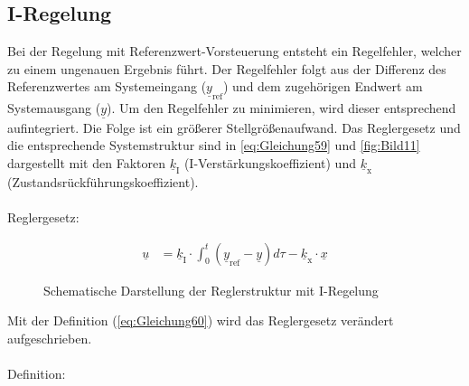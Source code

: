 \subsection{I-Regelung} \label{sec:iregler}
Bei der Regelung mit Referenzwert-Vorsteuerung entsteht ein Regelfehler, welcher zu einem ungenauen Ergebnis führt. Der Regelfehler folgt aus der Differenz des Referenzwertes am Systemeingang ($\underline{y}_{\mathrm{ref}}$) und dem zugehörigen Endwert am Systemausgang ($\underline{y}$). Um den Regelfehler zu minimieren, wird dieser entsprechend aufintegriert. Die Folge ist ein größerer Stellgrößenaufwand. Das Reglergesetz und die entsprechende Systemstruktur sind in \autoref{eq:Gleichung59} und \autoref{fig:Bild11} dargestellt mit den Faktoren $\underline{k}_{\mathrm{I}}$ (I-Verstärkungskoeffizient) und $\underline{k}_{\mathrm{x}}$ (Zustandsrückführungskoeffizient).\\\\
Reglergesetz:

\begin{align}\label{eq:Gleichung59}
    \underline{u} &= \underline{k}_{\mathrm{I}}\cdot\int_{0}^t(\underline{y}_{\mathrm{ref}}-\underline{y})d\tau-\underline{k}_{\mathrm{x}}\cdot\underline{x}
\end{align}

\begin{figure}[H]
    \centering
    \caption[Reglerstruktur I-Regelung]{Schematische Darstellung der Reglerstruktur mit I-Regelung}
    \label{fig:Bild11}
\end{figure}

Mit der Definition (\autoref{eq:Gleichung60}) wird das Reglergesetz verändert aufgeschrieben.\\\\
Definition:

